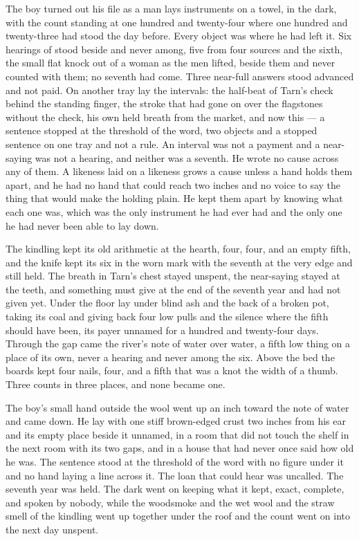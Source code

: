 The boy turned out his file as a man lays instruments on a towel, in the dark, with the count standing at one hundred and twenty-four where one hundred and twenty-three had stood the day before. Every object was where he had left it. Six hearings of  stood beside and never among, five from four sources and the sixth, the small flat knock out of a woman as the men lifted, beside them and never counted with them; no seventh had come. Three near-full answers stood advanced and not paid. On another tray lay the intervals: the half-beat of Tarn's check behind the standing finger, the stroke that had gone on over the flagstones without the check, his own held breath from the market, and now this --- a sentence stopped at the threshold of the word, two objects and a stopped sentence on one tray and not a rule. An interval was not a payment and a near-saying was not a hearing, and neither was a seventh. He wrote no cause across any of them. A likeness laid on a likeness grows a cause unless a hand holds them apart, and he had no hand that could reach two inches and no voice to say the thing that would make the holding plain. He kept them apart by knowing what each one was, which was the only instrument he had ever had and the only one he had never been able to lay down.

The kindling kept its old arithmetic at the hearth, four, four, and an empty fifth, and the knife kept its six in the worn mark with the seventh at the very edge and still held. The breath in Tarn's chest stayed unspent, the near-saying stayed at the teeth, and something must give at the end of the seventh year and had not given yet. Under the floor  lay under blind ash and the back of a broken pot, taking its coal and giving back four low pulls and the silence where the fifth should have been, its payer unnamed for a hundred and twenty-four days. Through the gap came the river's note of water over water, a fifth low thing on a place of its own, never a hearing and never among the six. Above the bed the boards kept four nails, four, and a fifth that was a knot the width of a thumb. Three counts in three places, and none became one.

The boy's small hand outside the wool went up an inch toward the note of water and came down. He lay with one stiff brown-edged crust two inches from his ear and its empty place beside it unnamed, in a room that did not touch the shelf in the next room with its two gaps, and in a house that had never once said how old he was. The sentence stood at the threshold of the word with no figure under it and no hand laying a line across it. The loan that could hear was uncalled. The seventh year was held. The dark went on keeping what it kept, exact, complete, and spoken by nobody, while the woodsmoke and the wet wool and the straw smell of the kindling went up together under the roof and the count went on into the next day unspent.

